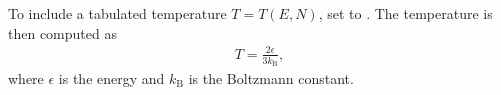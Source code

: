 \documentclass[letterpaper,10pt,english]{sphinxmanual}
\begin{document}
\begin{sphinxVerbatim}[commandchars=\\\{\},formatcom=\scriptsize]
  \PYG{p}{[}
       
        
       
       
       
         
         
  \PYG{p}{]}
\end{sphinxVerbatim}


To include a tabulated temperature \(T = T(E,N)\), set  to .
The temperature is then computed as
\begin{equation*}
\begin{split}T = \frac{2 \epsilon}{3k_{\textrm{B}}},\end{split}
\end{equation*}
where \(\epsilon\) is the energy and \(k_{\textrm{B}}\) is the Boltzmann constant.
\end{document}
